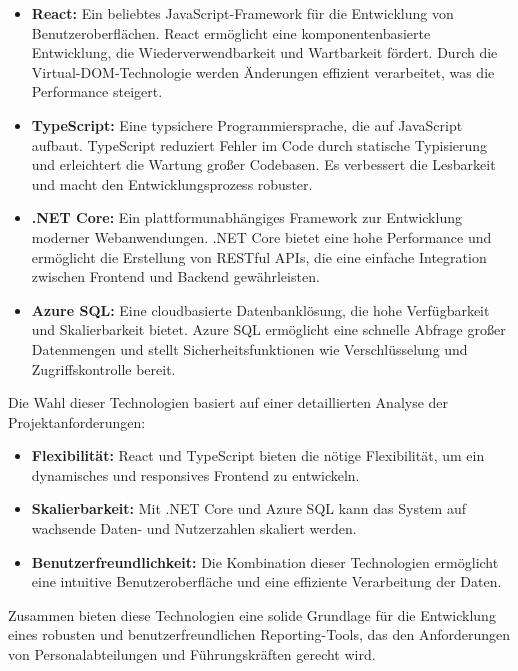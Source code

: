 \begin{itemize}
    \item \textbf{React:} Ein beliebtes JavaScript-Framework für die Entwicklung von Benutzeroberflächen. React ermöglicht eine komponentenbasierte Entwicklung, die Wiederverwendbarkeit und Wartbarkeit fördert. Durch die Virtual-DOM-Technologie werden Änderungen effizient verarbeitet, was die Performance steigert.
    \item \textbf{TypeScript:} Eine typsichere Programmiersprache, die auf JavaScript aufbaut. TypeScript reduziert Fehler im Code durch statische Typisierung und erleichtert die Wartung großer Codebasen. Es verbessert die Lesbarkeit und macht den Entwicklungsprozess robuster.
    \item \textbf{.NET Core:} Ein plattformunabhängiges Framework zur Entwicklung moderner Webanwendungen. .NET Core bietet eine hohe Performance und ermöglicht die Erstellung von RESTful APIs, die eine einfache Integration zwischen Frontend und Backend gewährleisten.
    \item \textbf{Azure SQL:} Eine cloudbasierte Datenbanklösung, die hohe Verfügbarkeit und Skalierbarkeit bietet. Azure SQL ermöglicht eine schnelle Abfrage großer Datenmengen und stellt Sicherheitsfunktionen wie Verschlüsselung und Zugriffskontrolle bereit.
\end{itemize}

Die Wahl dieser Technologien basiert auf einer detaillierten Analyse der Projektanforderungen:
\begin{itemize}
    \item \textbf{Flexibilität:} React und TypeScript bieten die nötige Flexibilität, um ein dynamisches und responsives Frontend zu entwickeln.
    \item \textbf{Skalierbarkeit:} Mit .NET Core und Azure SQL kann das System auf wachsende Daten- und Nutzerzahlen skaliert werden.
    \item \textbf{Benutzerfreundlichkeit:} Die Kombination dieser Technologien ermöglicht eine intuitive Benutzeroberfläche und eine effiziente Verarbeitung der Daten.
\end{itemize}

Zusammen bieten diese Technologien eine solide Grundlage für die Entwicklung eines robusten und benutzerfreundlichen Reporting-Tools, das den Anforderungen von Personalabteilungen und Führungskräften gerecht wird.
